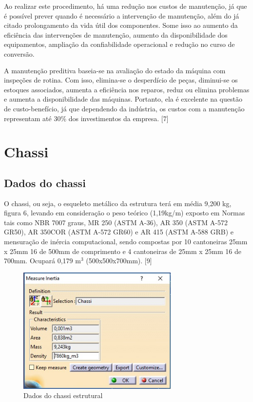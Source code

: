 Ao realizar este procedimento, há uma redução nos custos de manutenção, já que é possível prever quando é necessário a intervenção de manutenção, além do já citado prolongamento da vida útil dos componentes. Some isso ao aumento da eficiência das intervenções de manutenção, aumento da disponibilidade dos equipamentos, ampliação da confiabilidade operacional e redução no curso de conversão.

A manutenção preditiva baseia-se na avaliação do estado da máquina com inspeções de rotina. Com isso, elimina-se o desperdício de peças, diminui-se os estoques associados, aumenta a eficiência nos reparos, reduz ou elimina problemas e aumenta a disponibilidade das máquinas. Portanto, ela é excelente na questão de custo-benefício, já que dependendo da indústria, os custos com a manutenção representam até 30\% dos investimentos da empresa. [7]


\section{Chassi}

\subsection{Dados do chassi}

O chassi, ou seja, o esqueleto metálico da estrutura terá em média 9,200 kg, figura 6, levando em consideração o peso teórico (1,19kg/m) exposto em Normas tais como NBR 7007 graus, MR 250 (ASTM A-36), AR 350 (ASTM A-572 GR50), AR 350COR (ASTM A-572 GR60) e AR 415 (ASTM A-588 GRB) e mensuração de inércia computacional, sendo compostas por 10 cantoneiras 25mm x 25mm 16 de 500mm de comprimento e 4 cantoneiras de 25mm x 25mm 16 de 700mm. Ocupará 0,179 m$^{3}$ (500x500x700mm). [9]

\begin{figure}[H]
	\centering
	\includegraphics[width=8cm]{figuras/dados.jpg}
	\caption{Dados do chassi estrutural} 
	\label{dados}
\end{figure}